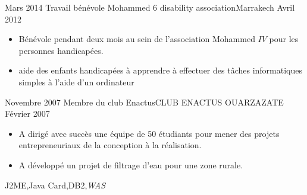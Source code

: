 %
%
%

\begin{experiences}

  \experience
    {Mars 2014}     {Travail bénévole} %
    {Mohammed 6 disability association}{Marrakech}
    {Avril 2012}    {
                      \begin{itemize}
						\item { Bénévole pendant deux mois au sein de l'association Mohammed $IV$  pour les personnes handicapées.}
						\item {aide des enfants handicapées à apprendre à effectuer des tâches informatiques simples à l'aide d'un ordinateur }  
                      \end{itemize}}
                    {}
  \emptySeparator       
  \experience
  {Novembre 2007}  {Membre du club Enactus}{CLUB ENACTUS OUARZAZATE}{}
  {Février 2007}   {
                      \begin{itemize}
						\item {A dirigé avec succès une équipe de 50 étudiants pour mener des projets entrepreneuriaux de la conception à la réalisation.}
						\item {A développé un projet de filtrage d'eau pour une zone rurale.}				   
                      \end{itemize}
                  }
                  {J2ME,Java Card,DB2,\emph{WAS}}  
\end{experiences}

